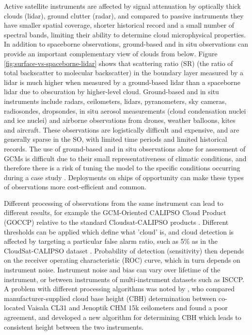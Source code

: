 Active satellite instruments are affected by signal attenuation by
optically thick
clouds (lidar), ground clutter (radar), and compared to passive instruments they have smaller spatial coverage,
shorter historical record and a small number of spectral bands, limiting their
ability to determine cloud microphysical properties.
In addition to spaceborne observations, ground-based and in situ
observations can provide an important complementary view of clouds from below.
Figure \ref{fig:surface-vs-spaceborne-lidar} shows that scattering ratio (SR)
(the ratio of total backscatter to molecular backscatter)
in the boundary layer measured by a lidar is much higher when measured by 
a ground-based lidar than a spaceborne lidar due to obscuration by higher-level
cloud.
Ground-based and in situ instruments include radars, ceilometers, lidars,
pyranometers, sky cameras, radiosondes, dropsondes, in situ aerosol measurements
(cloud condensation nuclei and ice nuclei) and airborne observations from
drones, weather balloons, kites and aircraft. These observations are logistically
difficult and expensive, and are generally sparse in the SO, with
limited time periods and limited historical records. The use of ground-based and
in situ observations alone for assessment of GCMs is difficult due to their
small representativeness of climatic conditions, and therefore there
is a risk of tuning the model to the specific conditions occurring during a
case study \citep{jakob2003}. Deployments on ships of opportunity can make these types
of observations more cost-efficient and common.

Different processing of observations from the same instrument can lead
to different results, for example the
GCM-Oriented CALIPSO Cloud Product (GOCCP) relative to the standard
Cloudsat-CALIPSO products \citep{chepfer2010}.
Different thresholds can be applied which define what 'cloud' is,
and cloud detection is affected by targeting a particular false alarm ratio,
such as 5\% as in the CloudSat-CALIPSO dataset \citep{hagihara2010}.
Probability of detection (sensitivity) then depends on the receiver operating
characteristic (ROC) curve, which in turn depends on instrument
noise. Instrument noise and bias can vary over lifetime of the instrument,
or between instruments of multi-instrument datasets such as ISCCP.
A problem with different processing
algorithms was noted by \cite{martucci2010}, who compared
manufacturer-supplied cloud base height (CBH)
determination between co-located Vaisala CL31 and Jenoptik CHM 15k ceilometers
and found a poor agreement, and developed a new algorithm for determining
CBH which leads to consistent height between the two instruments.

